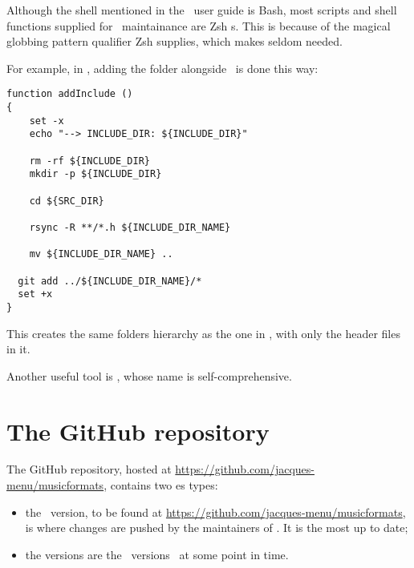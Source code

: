 Although the shell mentioned in the \mf\ user guide is Bash, most scripts and shell functions supplied for \mf\ maintainance are Zsh s.
This is because of the magical globbing pattern qualifier \code{**/} Zsh supplies, which makes  seldom needed.

For example, in , adding the  folder alongside \srcFolder\ is done this way:
\begin{lstlisting}[language=Terminal]
function addInclude ()
{
	set -x
	echo "--> INCLUDE_DIR: ${INCLUDE_DIR}"

	rm -rf ${INCLUDE_DIR}
	mkdir -p ${INCLUDE_DIR}

	cd ${SRC_DIR}

	rsync -R **/*.h ${INCLUDE_DIR_NAME}

	mv ${INCLUDE_DIR_NAME} ..

  git add ../${INCLUDE_DIR_NAME}/*
  set +x
}
\end{lstlisting}

This creates the same folders hierarchy as the one in \srcFolder, with only the  header files in it.

Another useful tool is , whose name is self-comprehensive.


\section{The GitHub repository}

The GitHub repository, hosted at \url{https://github.com/jacques-menu/musicformats}, contains two \branch es types:
\begin{itemize}
\item the  \master\ version, to be found at \url{https://github.com/jacques-menu/musicformats}, is where changes are pushed by the maintainers of \mf. It is the most up to date;
\item the  versions are the \master\ versions \frozen\ at some point in time.
\end{itemize}
